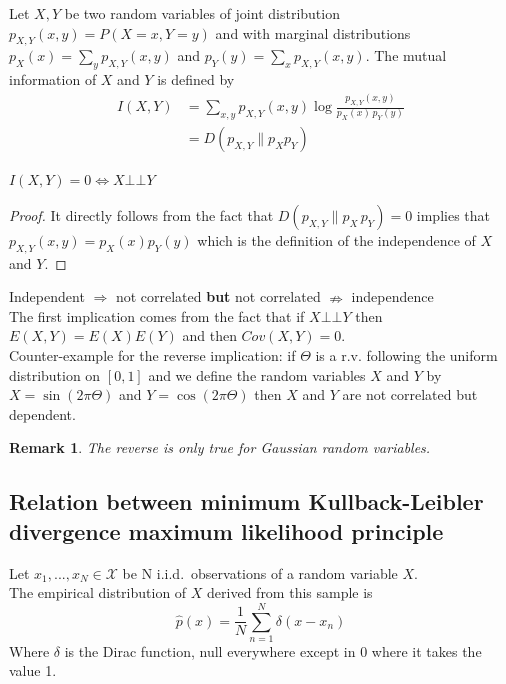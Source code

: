 \documentclass[12pt]{report}
\def\indep{\bot\!\!\!\bot}
\newtheorem{remark}{Remark}[section]
\begin{document}
\begin{definition}
Let $X,Y$ be two random variables of joint distribution $p_{X,Y}(x,y) = P(X=x,Y=y)$ and with marginal distributions $p_X(x)=\sum_{y}p_{X,Y}(x,y)$ and $p_Y(y)=\sum_{x}p_{X,Y}(x,y)$.
The mutual information of $X$ and $Y$  is defined by
$$\begin{aligned}
I(X,Y)&=\sum_{x,y} p_{X,Y}(x,y) \log \frac{p_{X,Y}(x,y)}{p_X(x)\,p_Y(y)}\\
&=D(p_{X,Y}\parallel p_Xp_Y)
\end{aligned}$$
\end{definition}

\begin{proposition}
$I(X,Y)= 0 \Leftrightarrow X\indep Y$
\end{proposition}

\begin{proof}
 It directly follows from the fact that $D(p_{X,Y}\parallel p_X\, p_Y)=0$ implies that $p_{X,Y}(x,y)=p_X(x)p_Y(y)$ which is the definition of the independence of $X$ and $Y$.
 \end{proof}

\begin{danger}
Independent $\Rightarrow$ not correlated  {\bf but} not correlated $\nRightarrow$ independence\\
The first implication comes from the fact that if $X\indep Y$ then $E(X,Y) = E(X)E(Y)$ and then $Cov(X,Y) = 0$. \\
Counter-example for the reverse implication: if $\Theta$ is a r.v. following the uniform distribution on $[0,1]$ and we define the random variables $X$ and $Y$ by $X=\sin (2\pi \Theta)$ and $Y=\cos(2\pi \Theta)$ then $X$ and $Y$ are not correlated but dependent.
\end{danger}
\begin{remark}
The reverse is only true for Gaussian random variables.
\end{remark}

\subsection{Relation between minimum Kullback-Leibler divergence  maximum likelihood principle}

\begin{definition}
Let $x_1,...,x_N\in \mathcal{X}$ be N  i.i.d.\ observations of a random variable $X$.\\
The empirical distribution of $X$ derived from this sample is $$\hat{p}(x)=\frac{1}{N} \sum_{n=1}^{N}\delta(x-x_n)$$
Where $\delta$ is the Dirac function, null everywhere except in 0 where it takes the value 1.
\end{definition}
\end{document}
